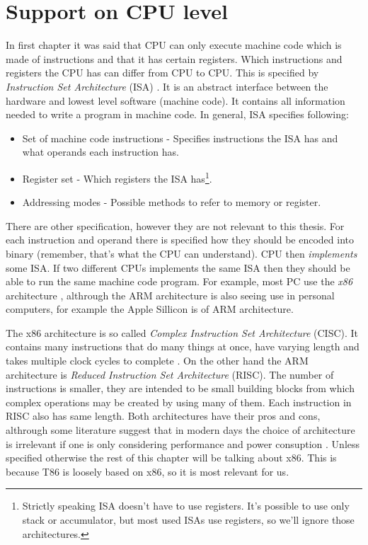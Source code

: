 \section{Support on CPU level} In first chapter it was said that CPU can only
execute machine code which is made of instructions and that it has certain
registers. Which instructions and registers the CPU has can differ from CPU to
CPU. This is specified by \textit{Instruction Set Architecture} (ISA)
\cite{aps-isa}. It is an abstract interface between the hardware and lowest
level software (machine code). It contains all information needed to write a
program in machine code. In general, ISA specifies following: 
\begin{itemize}
    \item Set of machine code instructions - Specifies instructions the ISA has
          and what operands each instruction has.
    \item Register set - Which
          registers the ISA has\footnote{Strictly speaking ISA doesn't have
          to use registers. It's possible to use only stack or accumulator,
          but most used ISAs use registers, so we'll ignore those
          architectures. }.   
    \item Addressing modes - Possible methods to refer to memory or register. 
\end{itemize} There are other specification,
however they are not relevant to this thesis. For each instruction and operand
there is specified how they should be encoded into binary (remember, that's
what the CPU can understand). CPU then \textit{implements} some ISA. If two
different CPUs implements the same ISA then they should be able to run the same
machine code program. For example, most PC use the \textit{x86} architecture
\cite{aps-isa}, althrough the ARM architecture is also seeing use in personal
computers, for example the Apple Sillicon is of ARM architecture.

The x86 architecture is so called \textit{Complex Instruction Set Architecture}
(CISC). It contains many instructions that do many things at once, have varying
length and takes multiple clock cycles to complete \cite{intel-manual}. On the
other hand the ARM architecture is \textit{Reduced Instruction Set
Architecture} (RISC). The number of instructions is smaller, they are intended
to be small building blocks from which complex operations may be created by
using many of them. Each instruction in RISC also has same length. Both
architectures have their pros and cons, althrough some literature suggest that
in modern days the choice of architecture is irrelevant if one is only
considering performance and power
consuption  \cite{riscvscisc1, riscvscisc2}. Unless specified otherwise the
rest of this chapter will be talking about x86. This is because T86 
is loosely based on x86, so it is most relevant for us.

